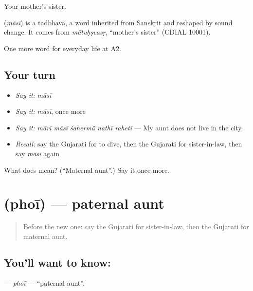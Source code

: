 Your mother's sister.

\begin{cousinweb}
\textbf{} (\emph{māsī}) is a tadbhava, a word inherited from Sanskrit and reshaped by sound change. It comes from \emph{mātuḥṣvasṛ}, \textquotedblleft{}mother's sister\textquotedblright{} (CDIAL 10001).
\end{cousinweb}

\begin{grammarlens}[title={What you've built}]
One more word for everyday life at A2.
\end{grammarlens}

\subsection*{Your turn}
\begin{itemize}
\raggedright
  \item \emph{Say it:} \emph{māsī}
  \item \emph{Say it:} \emph{māsī}, once more
  \item \emph{Say it:} \emph{mārī māsī śahermā̃ nathī rahetī} — My aunt does not live in the city.
  \item \emph{Recall:} say the Gujarati for to dive, then the Gujarati for sister-in-law, then say \emph{māsī} again
\end{itemize}

\begin{tcolorbox}[breakable,colback=teal!4,colframe=teal!35!black,title={Before you move on}]
What does  mean? (\textquotedblleft{}Maternal aunt\textquotedblright{}.) Say it once more.
\end{tcolorbox}
\section[\texorpdfstring{\gu{ફોઈ} (phoī)}{ફોઈ (phoī)}]{ (phoī) — paternal aunt}

\label{lesson:GU-C263-phoi}



\begin{quote}
Before the new one: say the Gujarati for sister-in-law, then the Gujarati for maternal aunt.
\end{quote}

\subsection*{You'll want to know: }
\textbf{} — \emph{phoī} — \textquotedblleft{}paternal aunt\textquotedblright{}.

